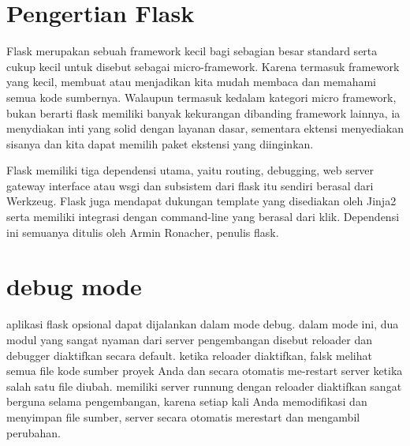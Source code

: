 \section{Pengertian Flask}
Flask merupakan sebuah framework kecil bagi sebagian besar standard serta cukup kecil untuk disebut sebagai micro-framework. 
Karena termasuk framework yang kecil, membuat atau menjadikan kita mudah membaca dan memahami semua kode sumbernya. 
Walaupun termasuk kedalam kategori micro framework, bukan berarti flask memiliki banyak kekurangan dibanding framework lainnya, ia menydiakan inti yang solid dengan layanan dasar, sementara ektensi menyediakan sisanya dan kita dapat memilih paket ekstensi yang diinginkan.

Flask memiliki tiga dependensi utama, yaitu routing, debugging, web server gateway interface atau wsgi dan subsistem dari flask itu sendiri berasal dari Werkzeug. Flask juga mendapat dukungan template yang disediakan oleh Jinja2 serta memiliki integrasi dengan  command-line yang berasal dari klik. Dependensi ini semuanya ditulis oleh Armin Ronacher, penulis flask. 

\section{debug mode}
aplikasi flask opsional dapat dijalankan dalam mode debug. dalam mode ini, dua modul yang sangat nyaman dari server pengembangan disebut 
reloader dan debugger diaktifkan secara default. ketika reloader diaktifkan, falsk melihat semua file kode sumber proyek Anda dan secara 
otomatis me-restart server ketika salah satu file diubah. memiliki server runnung dengan reloader diaktifkan sangat berguna selama 
pengembangan, karena setiap kali Anda memodifikasi dan menyimpan file sumber, server secara otomatis merestart dan mengambil perubahan.
